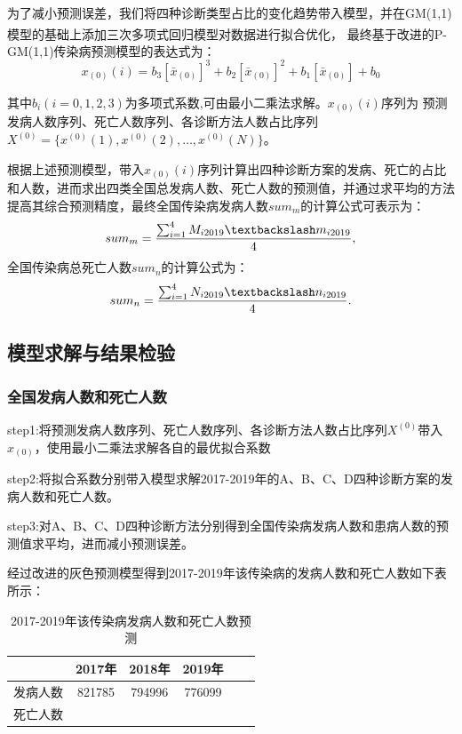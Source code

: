 \documentclass{whutmod}
\begin{document}
为了减小预测误差，我们将四种诊断类型占比的变化趋势带入模型，并在GM(1,1)模型的基础上添加三次多项式回归模型对数据进行拟合优化\textsuperscript{\cite{bib:two}}，
最终基于改进的P-GM(1,1)传染病预测模型的表达式为：
\begin{equation}
    x_{(0)}(i)=b_3[\bar x_{(0)}]^3+b_2[\bar x_{(0)}]^2+b_1[\bar x_{(0)}]+b_0
\end{equation}

其中$b_i(i=0,1,2,3)$为多项式系数,可由最小二乘法求解。$x_{(0)}(i)$序列为
预测发病人数序列、死亡人数序列、各诊断方法人数占比序列$X^{(0)}=\{x^{(0)}(1),x^{(0)}(2),\dots,x^{(0)}(N)\}$。

根据上述预测模型，带入$x_{(0)}(i)$序列计算出四种诊断方案的发病、死亡的占比和人数，进而求出四类全国总发病人数、死亡人数的预测值，并通过求平均的方法提高其综合预测精度，最终全国传染病发病人数$sum_m$的计算公式可表示为：
\begin{equation}
    sum_m=\frac{\sum_{i=1}^4M_{i2019}\textbackslash m_{i2019}}4,
\end{equation}
全国传染病总死亡人数$sum_n$的计算公式为：
\begin{equation}
    sum_n=\frac{\sum_{i=1}^4N_{i2019}\textbackslash n_{i2019}}4.
\end{equation}

\subsection{模型求解与结果检验}
\subsubsection{全国发病人数和死亡人数}

    step1:将预测发病人数序列、死亡人数序列、各诊断方法人数占比序列$X^{(0)}$带入$x_{(0)}$，使用最小二乘法求解各自的最优拟合系数

    step2:将拟合系数分别带入模型求解2017-2019年的A、B、C、D四种诊断方案的发病人数和死亡人数。

    step3:对A、B、C、D四种诊断方法分别得到全国传染病发病人数和患病人数的预测值求平均，进而减小预测误差。


经过改进的灰色预测模型得到2017-2019年该传染病的发病人数和死亡人数如下表所示：
\begin{table}[H]
    \caption{2017-2019年该传染病发病人数和死亡人数预测} \centering
    \begin{tabular*}{8cm}{cccccc}
        \toprule[1.5pt]
         & 2017年 & 2018年 & 2019年 \\
         \midrule[1pt]
         发病人数 & 821785 & 794996 & 776099 \\
         死亡人数 & & & \\
         \bottomrule[1.5pt]
    \end{tabular*}
\end{table}
\end{document}

